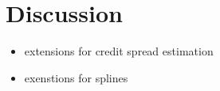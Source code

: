 \section{Discussion}

\begin{itemize}
\item extensions for credit spread estimation \cite{Jankowitsch2004, Geyer2004}
\item exenstions for splines \cite{Vasicek1982, Fisher1995}
\end{itemize}